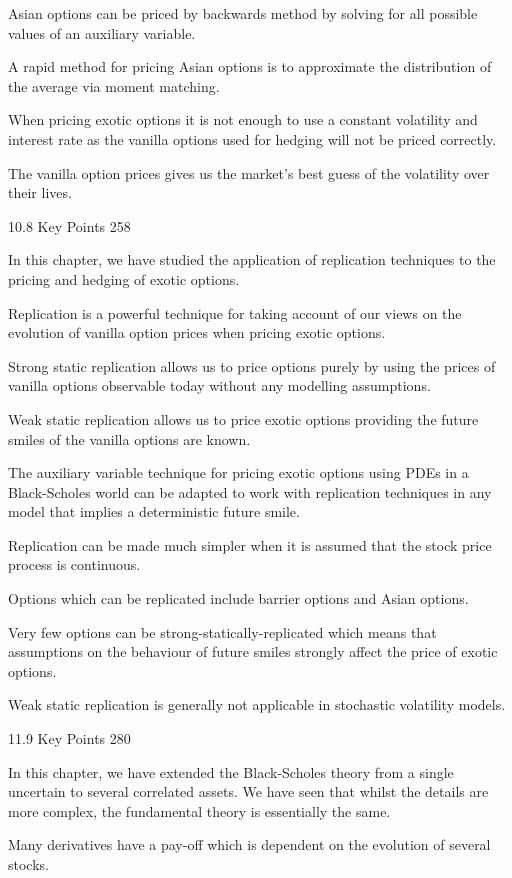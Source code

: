 Asian options can be priced by backwards method by solving for all possible values of an auxiliary variable.

A rapid method for pricing Asian options is to approximate the distribution of the average via moment matching.

When pricing exotic options it is not enough to use a constant volatility and interest rate as the vanilla options used for hedging will not be priced correctly.

The vanilla option prices gives us the market's best guess of the volatility over their lives.

10.8 Key Points 258

In this chapter, we have studied the application of replication techniques to the pricing and hedging of exotic options.

Replication is a powerful technique for taking account of our views on the evolution of vanilla option prices when pricing exotic options.

Strong static replication allows us to price options purely by using the prices of vanilla options observable today without any modelling assumptions.

Weak static replication allows us to price exotic options providing the future smiles of the vanilla options are known.

The auxiliary variable technique for pricing exotic options using PDEs in a Black-Scholes world can be adapted to work with replication techniques in any model that implies a deterministic future smile.

Replication can be made much simpler when it is assumed that the stock price process is continuous.

Options which can be replicated include barrier options and Asian options.

Very few options can be strong-statically-replicated which means that assumptions on the behaviour of future smiles strongly affect the price of exotic options.

Weak static replication is generally not applicable in stochastic volatility models.

11.9 Key Points 280

In this chapter, we have extended the Black-Scholes theory from a single uncertain to several correlated assets. We have seen that whilst the details are more complex, the fundamental theory is essentially the same.

Many derivatives have a pay-off which is dependent on the evolution of several stocks.

